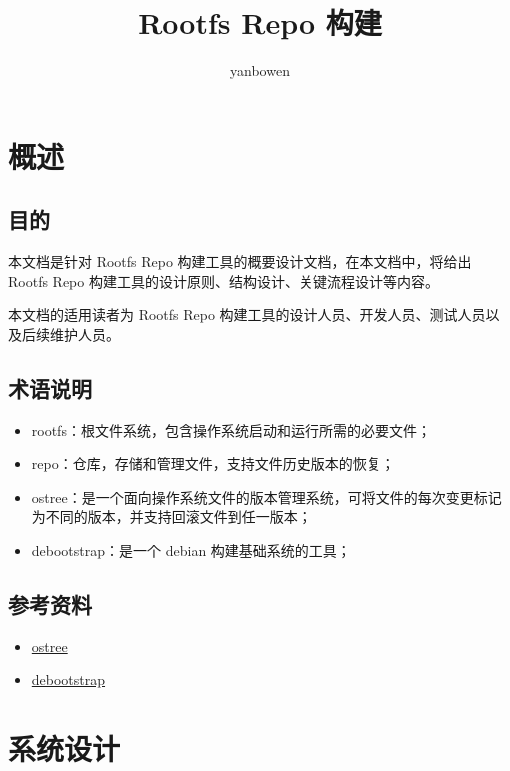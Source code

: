 \documentclass{utart}
\author{yanbowen}
\title{Rootfs Repo 构建}
\begin{document}
\utMakeTOC

\section{概述}
\subsection{目的}
本文档是针对 Rootfs Repo 构建工具的概要设计文档，在本文档中，将给出 Rootfs Repo 构建工具的设计原则、结构设计、关键流程设计等内容。

本文档的适用读者为 Rootfs Repo 构建工具的设计人员、开发人员、测试人员以及后续维护人员。

\subsection{术语说明}
\begin{itemize}[leftmargin=4em]
\item rootfs：根文件系统，包含操作系统启动和运行所需的必要文件；
\item repo：仓库，存储和管理文件，支持文件历史版本的恢复；
\item ostree：是一个面向操作系统文件的版本管理系统，可将文件的每次变更标记为不同的版本，并支持回滚文件到任一版本；
\item debootstrap：是一个 debian 构建基础系统的工具；
\end{itemize}

\subsection{参考资料}
\begin{itemize}[leftmargin=4em]
\item \href{https://ostreedev.github.io/ostree/}{ostree}
\item \href{https://wiki.debian.org/Debootstrap}{debootstrap}
\end{itemize}

\section{系统设计}
\end{document}
